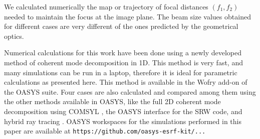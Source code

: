 \documentclass{iucr}              %
\begin{document}
We calculated numerically the map or trajectory of focal distances $(f_1,f_2)$ needed to maintain the focus at the image plane. The beam size values obtained for different cases are very different of the ones predicted by the geometrical optics.  

Numerical calculations for this work have been done using a newly developed method of coherent mode decomposition in 1D. This method is very fast, and many simulations can be run in a laptop, therefore it is ideal for parametric calculations as presented here. This method is available in the Wofry add-on of the OASYS\cite{codeOASYS} suite. Four cases are also calculated and compared among them using the other methods available in OASYS, like the full 2D coherent mode decomposition using COMSYL \cite{codeCOMSYL}, the OASYS interface for the SRW \cite{codeSRW} code, and hybrid ray tracing \cite{codeHYBRID}. OASYS workspaces for the simulations performed in this paper are available at {\tt https://github.com/oasys-esrf-kit/...} 


\appendix






    


    
    
\end{document}
